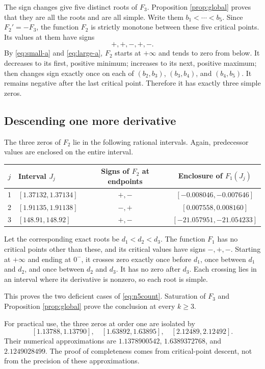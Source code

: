\documentclass[11pt]{article}
\numberwithin{equation}{section}
\theoremstyle{definition}\newtheorem{definition}[theorem]{Definition}
\theoremstyle{remark}\newtheorem{remark}[theorem]{Remark}
\begin{document}
The sign changes give five distinct roots of $F_3$. Proposition \ref{prop:global} proves that they are all the roots and are all simple. Write them $b_1<\cdots<b_5$. Since $F_2'=-F_3$, the function $F_2$ is strictly monotone between these five critical points. Its values at them have signs
\begin{equation}\label{eq:F2crit}
+,+,-,+,-.
\end{equation}
By \eqref{eq:small-a} and \eqref{eq:large-a}, $F_2$ starts at $+\infty$ and tends to zero from below. It decreases to its first, positive minimum; increases to its next, positive maximum; then changes sign exactly once on each of $(b_2,b_3)$, $(b_3,b_4)$, and $(b_4,b_5)$. It remains negative after the last critical point. Therefore it has exactly three simple zeros.

\subsection{Descending one more derivative}
The three zeros of $F_2$ lie in the following rational intervals. Again, predecessor values are enclosed on the entire interval.
\begin{center}\small
\begin{tabular}{clcc}
\toprule
$j$ & Interval $J_j$ & Signs of $F_2$ at endpoints & Enclosure of $F_1(J_j)$\\
\midrule
1 & $[1.37132,1.37134]$ & $+,-$ & $[-0.008046,-0.007646]$\\
2 & $[1.91135,1.91138]$ & $-,+$ & $[0.007558,0.008160]$\\
3 & $[148.91,148.92]$ & $+,-$ & $[-21.057951,-21.054233]$\\
\bottomrule
\end{tabular}
\end{center}
Let the corresponding exact roots be $d_1<d_2<d_3$. The function $F_1$ has no critical points other than these, and its critical values have signs $-,+,-$. Starting at $+\infty$ and ending at $0^-$, it crosses zero exactly once before $d_1$, once between $d_1$ and $d_2$, and once between $d_2$ and $d_3$. It has no zero after $d_3$. Each crossing lies in an interval where its derivative is nonzero, so each root is simple.

This proves the two deficient cases of \eqref{eq:n5count}. Saturation of $F_3$ and Proposition \ref{prop:global} prove the conclusion at every $k\geq3$.

For practical use, the three zeros at order one are isolated by
\begin{equation}\label{eq:n5firstbrackets}
[1.13788,1.13790],\quad [1.63892,1.63895],\quad [2.12489,2.12492].
\end{equation}
Their numerical approximations are $1.1378900542$, $1.6389372768$, and $2.1249028499$. The proof of completeness comes from critical-point descent, not from the precision of these approximations.
\end{document}

